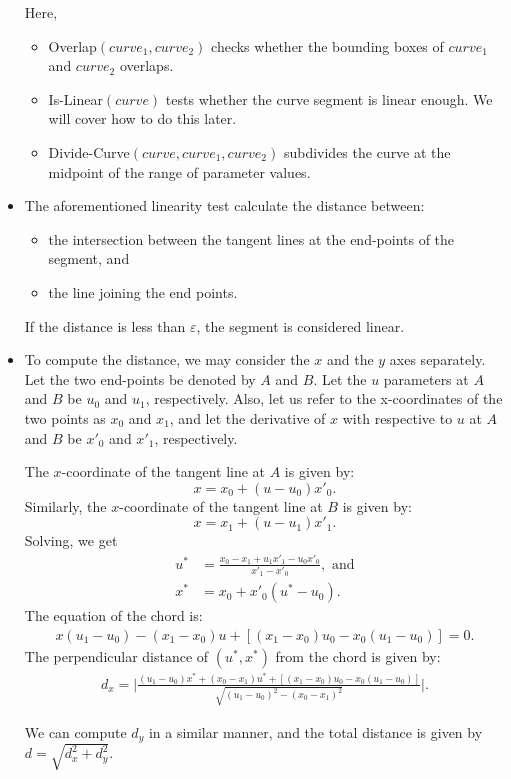\documentclass[10pt]{article}
\begin{document}
\begin{itemize}
  Here,
  \begin{itemize}
    \item {\sc Overlap}$(curve_1, curve_2)$ checks whether the bounding boxes of $curve_1$ and $curve_2$ overlaps.
    
    \item {\sc Is-Linear}$(curve)$ tests whether the curve segment is linear enough. We will cover how to do this later.
    
    \item {\sc Divide-Curve}$(curve, curve_1, curve_2)$ subdivides the curve at the midpoint of the range of parameter values.    
  \end{itemize}
  
  \item The aforementioned linearity test calculate the distance between:
  \begin{itemize}
    \item the intersection between the tangent lines at the end-points of the segment, and
    \item the line joining the end points.
  \end{itemize}
  If the distance is less than $\varepsilon$, the segment is considered linear.
  
  \item To compute the distance, we may consider the $x$ and the $y$ axes separately. Let the two end-points be denoted by $A$ and $B$. Let the $u$ parameters at $A$ and $B$ be $u_0$ and $u_1$, respectively. Also, let us refer to the x-coordinates of the two points as $x_0$ and $x_1$, and let the derivative of $x$ with respective to $u$ at $A$ and $B$ be $x'_0$ and $x'_1$, respectively.
  
  The $x$-coordinate of the tangent line at $A$ is given by:
  $$x = x_0 + (u - u_0) x'_0.$$
  Similarly, the $x$-coordinate of the tangent line at $B$ is given by:
  $$x = x_1 + (u-u_1)x'_1.$$
  Solving, we get
  \begin{align*}
    u^* &= \frac{x_0 - x_1 + u_1 x'_1 - u_0 x'_0}{x'_1 - x'_0}, \mbox{ and}\\
    x^* &= x_0 + x'_0(u^* - u_0).
  \end{align*}
  The equation of the chord is:
  \begin{align*}
    x(u_1 - u_0) - (x_1 - x_0)u + [(x_1 - x_0)u_0 - x_0(u_1-u_0)] = 0.
  \end{align*}
  The perpendicular distance of $(u^*, x^*)$ from the chord is given by:
  \begin{align*}
    d_x = \bigg| \frac{(u_1 - u_0)x^* + (x_0 - x_1)u^* + [(x_1 - x_0)u_0 - x_0(u_1 -u_0)]}{\sqrt{(u_1 - u_0)^2 - (x_0 - x_1)^2}} \bigg|.
  \end{align*}
  
  We can compute $d_y$ in a similar manner, and the total distance is given by $d = \sqrt{d_x^2 + d_y^2}$.
  
\end{itemize}
\end{document}
